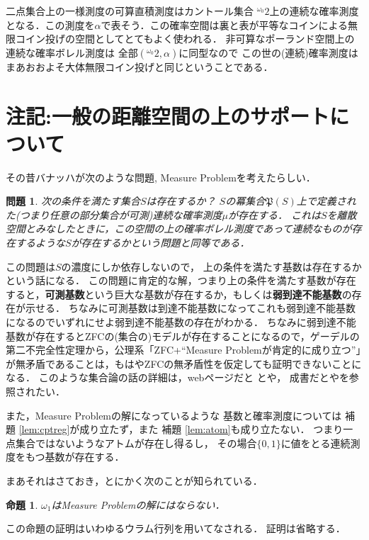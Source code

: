 \documentclass[leqno, 12pt]{jsarticle}
\newtheorem{prop}[thm]{命題}
\newtheorem*{prob}{問題}
\newcommand{\myomega}{\omega_{0}}
\newcommand{\mycantor}{{}^{\myomega}2}
\newcommand{\mypow}[1]{\mathfrak{P}(#1)}
\begin{document}
二点集合上の一様測度の可算直積測度はカントール集合
$\mycantor$上の連続な確率測度となる．この測度を$\alpha$で表そう．この確率空間は裏と表が平等なコインによる無限コイン投げの空間としてとてもよく使われる．
非可算なポーランド空間上の連続な確率ボレル測度は
全部$(\mycantor, \alpha)$に同型なので
この世の(連続)確率測度はまあおおよそ大体無限コイン投げと同じということである．

\section{注記:一般の距離空間の上のサポートについて}

その昔バナッハが次のような問題, Measure Problemを考えたらしい．
\begin{prob}
次の条件を満たす集合$S$は存在するか？
$S$の冪集合$\mypow{S}$上で定義された(つまり任意の部分集合が可測)連続な確率測度$\mu$が存在する．
これは$S$を離散空間とみなしたときに，この空間の上の確率ボレル測度であって連続なものが存在するような$S$が存在するかという問題と同等である．
\end{prob}
この問題は$S$の濃度にしか依存しないので，
上の条件を満たす基数は存在するかという話になる．
この問題に肯定的な解，つまり上の条件を満たす基数が存在すると，\textbf{可測基数}という巨大な基数が存在するか，もしくは\textbf{弱到達不能基数}の存在が示せる．
ちなみに可測基数は到達不能基数になってこれも弱到達不能基数になるのでいずれにせよ弱到達不能基数の存在がわかる．
ちなみに弱到達不能基数が存在するとZFCの(集合の)モデルが存在することになるので，ゲーデルの第二不完全性定理から，公理系「ZFC+``Measure Problemが肯定的に成り立つ''」が無矛盾であることは，もはやZFCの無矛盾性を仮定しても証明できないことになる．
このような集合論の話の詳細は，webページだと
\cite{konnsan}と\cite{dig}や，
成書だと\cite{Je}や\cite{rings}を参照されたい．

また，Measure Problemの解になっているような
基数と確率測度については
補題
\ref{lem:cptreg}が成り立たず，また
補題
\ref{lem:atom}も成り立たない．
つまり一点集合ではないようなアトムが存在し得るし，
その場合$\{0, 1\}$に値をとる連続測度をもつ基数が存在する．

まあそれはさておき，とにかく次のことが知られている．
\begin{prop}
$\omega_{1}$はMeasure Problemの解にはならない．
\end{prop}
この命題の証明はいわゆるウラム行列を用いてなされる．
証明は省略する．
\end{document}
